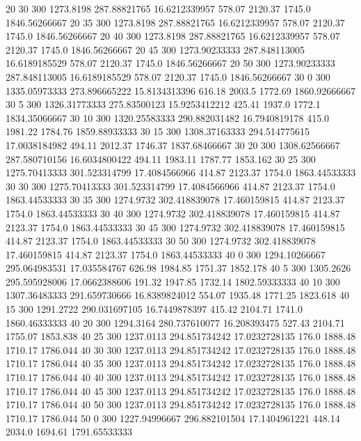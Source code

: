20  30  300  1273.8198  287.88821765  16.6212339957  578.07  2120.37  1745.0  1846.56266667 
20  35  300  1273.8198  287.88821765  16.6212339957  578.07  2120.37  1745.0  1846.56266667 
20  40  300  1273.8198  287.88821765  16.6212339957  578.07  2120.37  1745.0  1846.56266667 
20  45  300  1273.90233333  287.848113005  16.6189185529  578.07  2120.37  1745.0  1846.56266667 
20  50  300  1273.90233333  287.848113005  16.6189185529  578.07  2120.37  1745.0  1846.56266667 
30  0  300  1335.05973333  273.896665222  15.8134313396  616.18  2003.5  1772.69  1860.92666667 
30  5  300  1326.31773333  275.83500123  15.9253412212  425.41  1937.0  1772.1  1834.35066667 
30  10  300  1320.25583333  290.882031482  16.7940819178  415.0  1981.22  1784.76  1859.88933333 
30  15  300  1308.37163333  294.514775615  17.0038184982  494.11  2012.37  1746.37  1837.68466667 
30  20  300  1308.62566667  287.580710156  16.6034800422  494.11  1983.11  1787.77  1853.162 
30  25  300  1275.70413333  301.523314799  17.4084566966  414.87  2123.37  1754.0  1863.44533333 
30  30  300  1275.70413333  301.523314799  17.4084566966  414.87  2123.37  1754.0  1863.44533333 
30  35  300  1274.9732  302.418839078  17.460159815  414.87  2123.37  1754.0  1863.44533333 
30  40  300  1274.9732  302.418839078  17.460159815  414.87  2123.37  1754.0  1863.44533333 
30  45  300  1274.9732  302.418839078  17.460159815  414.87  2123.37  1754.0  1863.44533333 
30  50  300  1274.9732  302.418839078  17.460159815  414.87  2123.37  1754.0  1863.44533333 
40  0  300  1294.10266667  295.064983531  17.035584767  626.98  1984.85  1751.37  1852.178 
40  5  300  1305.2626  295.595928006  17.0662388606  191.32  1947.85  1732.14  1802.59333333 
40  10  300  1307.36483333  291.659730666  16.8389824012  554.07  1935.48  1771.25  1823.618 
40  15  300  1291.2722  290.031697105  16.7449878397  415.42  2104.71  1741.0  1860.46333333 
40  20  300  1294.3164  280.737610077  16.208393475  527.43  2104.71  1755.07  1853.838 
40  25  300  1237.0113  294.851734242  17.0232728135  176.0  1888.48  1710.17  1786.044 
40  30  300  1237.0113  294.851734242  17.0232728135  176.0  1888.48  1710.17  1786.044 
40  35  300  1237.0113  294.851734242  17.0232728135  176.0  1888.48  1710.17  1786.044 
40  40  300  1237.0113  294.851734242  17.0232728135  176.0  1888.48  1710.17  1786.044 
40  45  300  1237.0113  294.851734242  17.0232728135  176.0  1888.48  1710.17  1786.044 
40  50  300  1237.0113  294.851734242  17.0232728135  176.0  1888.48  1710.17  1786.044 
50  0  300  1227.94996667  296.882101504  17.1404961221  448.14  2034.0  1694.61  1791.65533333 
